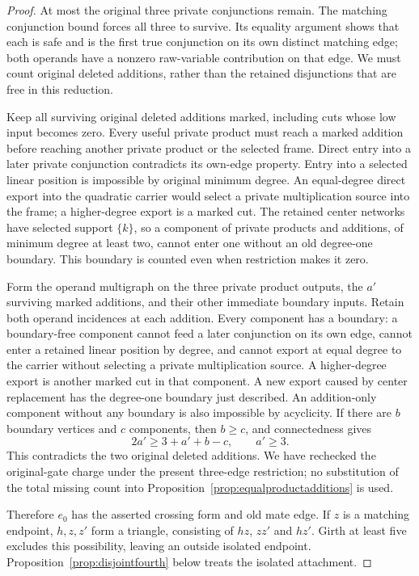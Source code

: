 \documentclass[11pt]{article}
\theoremstyle{definition}
\theoremstyle{remark}
\begin{document}
\begin{proof}
At most the original three private conjunctions remain. The matching conjunction bound forces all three to survive. Its equality argument shows that each is safe and is the first true conjunction on its own distinct matching edge; both operands have a nonzero raw-variable contribution on that edge. We must count original deleted additions, rather than the retained disjunctions that are free in this reduction.

Keep all surviving original deleted additions marked, including cuts whose low input becomes zero. Every useful private product must reach a marked addition before reaching another private product or the selected frame. Direct entry into a later private conjunction contradicts its own-edge property. Entry into a selected linear position is impossible by original minimum degree. An equal-degree direct export into the quadratic carrier would select a private multiplication source into the frame; a higher-degree export is a marked cut. The retained center networks have selected support $\{k\}$, so a component of private products and additions, of minimum degree at least two, cannot enter one without an old degree-one boundary. This boundary is counted even when restriction makes it zero.

Form the operand multigraph on the three private product outputs, the $a'$ surviving marked additions, and their other immediate boundary inputs. Retain both operand incidences at each addition. Every component has a boundary: a boundary-free component cannot feed a later conjunction on its own edge, cannot enter a retained linear position by degree, and cannot export at equal degree to the carrier without selecting a private multiplication source. A higher-degree export is another marked cut in that component. A new export caused by center replacement has the degree-one boundary just described. An addition-only component without any boundary is also impossible by acyclicity. If there are $b$ boundary vertices and $c$ components, then $b\ge c$, and connectedness gives
\[
 2a'\ge3+a'+b-c,\qquad a'\ge3.
\]
This contradicts the two original deleted additions. We have rechecked the original-gate charge under the present three-edge restriction; no substitution of the total missing count into Proposition~\ref{prop:equalproductadditions} is used.

Therefore $e_0$ has the asserted crossing form and old mate edge. If $z$ is a matching endpoint, $h,z,z'$ form a triangle, consisting of $hz$, $zz'$ and $hz'$. Girth at least five excludes this possibility, leaving an outside isolated endpoint. Proposition~\ref{prop:disjointfourth} below treats the isolated attachment.
\end{proof}
\end{document}

